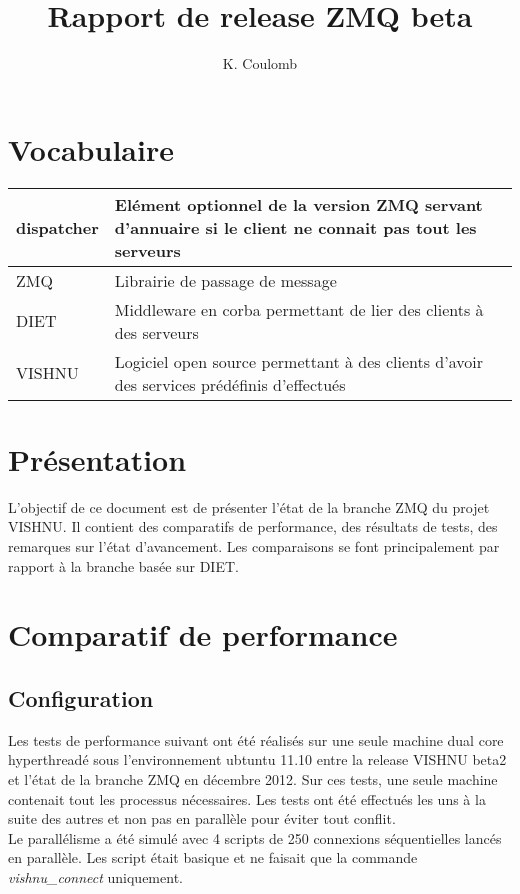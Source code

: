 \documentclass{article}
\title{Rapport de release ZMQ beta}
\author{K. Coulomb}
\begin{document}
\frontmatter %
\maketitle %
\tableofcontents %
\mainmatter %



\section{Vocabulaire}

\begin{tabular}{|l|l|}
\hline
dispatcher & Elément optionnel de la version ZMQ servant d'annuaire si le client ne connait pas tout les serveurs \\
\hline
ZMQ & Librairie de passage de message \\
\hline
DIET & Middleware en corba permettant de lier des clients à des serveurs \\
\hline
VISHNU & Logiciel open source permettant à des clients d'avoir des services prédéfinis d'effectués \\
\hline
\end{tabular}

\section{Pr\'esentation}

L'objectif de ce document est de présenter l'état de la branche
ZMQ du projet VISHNU. Il contient des comparatifs de performance,
des résultats de tests, des remarques sur l'état d'avancement.
Les comparaisons se font principalement par rapport à la branche
basée sur DIET.

\section{Comparatif de performance}

\subsection{Configuration}
Les tests de performance suivant ont été réalisés sur une seule
machine dual core hyperthreadé sous l'environnement ubtuntu 11.10
entre la release VISHNU beta2 et l'état de la branche ZMQ en 
décembre 2012. Sur ces tests, une seule machine contenait tout 
les processus nécessaires. Les tests ont été effectués les uns
à la suite des autres et non pas en parallèle pour éviter tout
conflit. \\
Le parallélisme a été simulé avec 4 scripts de 250 connexions séquentielles 
lancés en parallèle. 
Les script était basique et ne faisait que la commande \textit{vishnu\_connect} 
uniquement.
\end{document}
